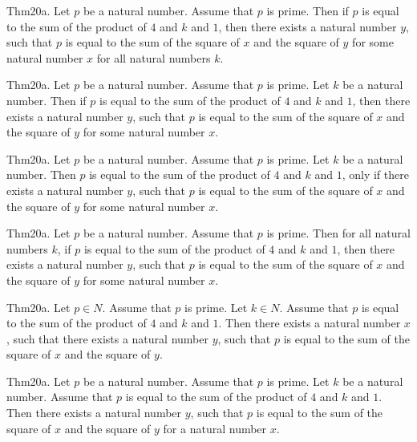 \documentclass{article}
\begin{document}
Thm20a. Let $p$ be a natural number. Assume that $p$ is prime. Then if $p$ is equal to the sum of the product of $4$ and $k$ and $1$, then there exists a natural number $y$, such that $p$ is equal to the sum of the square of $x$ and the square of $y$ for some natural number $x$ for all natural numbers $k$.

Thm20a. Let $p$ be a natural number. Assume that $p$ is prime. Let $k$ be a natural number. Then if $p$ is equal to the sum of the product of $4$ and $k$ and $1$, then there exists a natural number $y$, such that $p$ is equal to the sum of the square of $x$ and the square of $y$ for some natural number $x$.

Thm20a. Let $p$ be a natural number. Assume that $p$ is prime. Let $k$ be a natural number. Then $p$ is equal to the sum of the product of $4$ and $k$ and $1$, only if there exists a natural number $y$, such that $p$ is equal to the sum of the square of $x$ and the square of $y$ for some natural number $x$.

Thm20a. Let $p$ be a natural number. Assume that $p$ is prime. Then for all natural numbers $k$, if $p$ is equal to the sum of the product of $4$ and $k$ and $1$, then there exists a natural number $y$, such that $p$ is equal to the sum of the square of $x$ and the square of $y$ for some natural number $x$.

Thm20a. Let $p \in N$. Assume that $p$ is prime. Let $k \in N$. Assume that $p$ is equal to the sum of the product of $4$ and $k$ and $1$. Then there exists a natural number $x$, such that there exists a natural number $y$, such that $p$ is equal to the sum of the square of $x$ and the square of $y$.

Thm20a. Let $p$ be a natural number. Assume that $p$ is prime. Let $k$ be a natural number. Assume that $p$ is equal to the sum of the product of $4$ and $k$ and $1$. Then there exists a natural number $y$, such that $p$ is equal to the sum of the square of $x$ and the square of $y$ for a natural number $x$.
\end{document}
